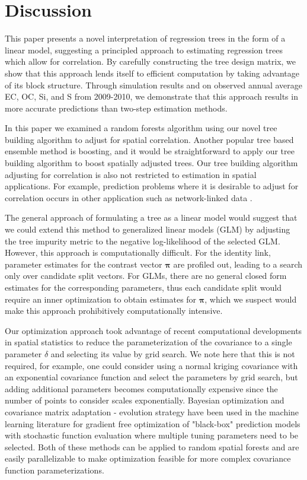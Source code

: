 \documentclass[12pt]{article}
\begin{document}
\section{Discussion}

This paper presents a novel interpretation of regression trees in the form of a linear model, suggesting a principled approach to estimating regression trees which allow for correlation. By carefully constructing the tree design matrix, we show that this approach lends itself to efficient computation by taking advantage of its block structure. Through simulation results and on observed annual average EC, OC, Si, and S from 2009-2010, we demonstrate that this approach results in more accurate predictions than two-step estimation methods. 

In this paper we examined a random forests algorithm using our novel tree building algorithm to adjust for spatial correlation. Another popular tree based ensemble method is boosting, and it would be straightforward to apply our tree building algorithm to boost spatially adjusted trees. Our tree building algorithm adjusting for correlation is also not restricted to estimation in spatial applications. For example, prediction problems where it is desirable to adjust for correlation occurs in other application such as network-linked data \cite{li2019prediction}. 

The general approach of formulating a tree as a linear model would suggest that we could extend this method to generalized linear models (GLM) by adjusting the tree impurity metric to the negative log-likelihood of the selected GLM. However, this approach is computationally difficult. For the identity link, parameter estimates for the contrast vector $\boldsymbol{\pi}$ are profiled out, leading to a search only over candidate split vectors. For GLMs, there are no general closed form estimates for the corresponding parameters, thus each candidate split would require an inner optimization to obtain estimates for $\boldsymbol{\pi}$, which we suspect would make this approach prohibitively computationally intensive.

Our optimization approach took advantage of recent computational developments in spatial statistics to reduce the parameterization of the covariance to a single parameter $\delta$ and selecting its value by grid search. We note here that this is not required, for example, one could consider using a normal kriging covariance with an exponential covariance function and select the parameters by grid search, but adding additional parameters becomes computationally expensive since the number of points to consider scales exponentially. Bayesian optimization and covariance matrix adaptation - evolution strategy have been used in the machine learning literature for gradient free optimization of "black-box" prediction models with stochastic function evaluation where multiple tuning parameters need to be selected. Both of these methods can be applied to random spatial forests and are easily parallelizable to make optimization feasible for more complex covariance function parameterizations.


\end{document}

